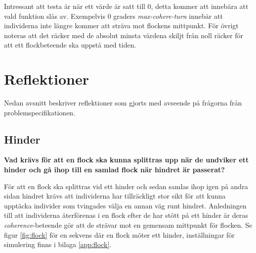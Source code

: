 \documentclass[titlepage, a4paper, 12pt]{article}
\begin{document}
Intressant att testa är när ett värde är satt till 0, detta kommer att
innebära att vald funktion slås av. Exempelvis 0 graders
\textit{max-cohere-turn} innebär att individerna inte längre kommer
att sträva mot flockens mittpunkt. För övrigt noteras att det räcker
med de absolut minsta värdena skiljt från noll räcker för att ett
flockbeteende ska uppstå med tiden.

\section{Reflektioner}\label{sec:reflektioner}


Nedan avsnitt beskriver reflektioner som gjorts med avseende på
frågorna från problemspecifikationen.

\subsection{Hinder}
\textbf{Vad krävs för att en flock ska kunna splittras upp när de
  undviker ett hinder och gå ihop till en samlad flock när hindret är
  passerat?}

För att en flock ska splittras vid ett hinder och sedan samlas ihop
igen på andra sidan hindret krävs att individerna har tillräckligt
stor sikt för att kunna upptäcka individer som tvingades välja en
annan väg runt hindret. Anledningen till att individerna återförenas i
en flock efter de har stött på ett hinder är deras
\textit{coherence}-beteende gör att de strävar mot en gemensam
mittpunkt för flocken. Se figur \ref{fig:flock} för en sekvens där en
flock möter ett hinder, inställningar för simulering finns i bilaga
\ref{app:flock}.
\end{document}
